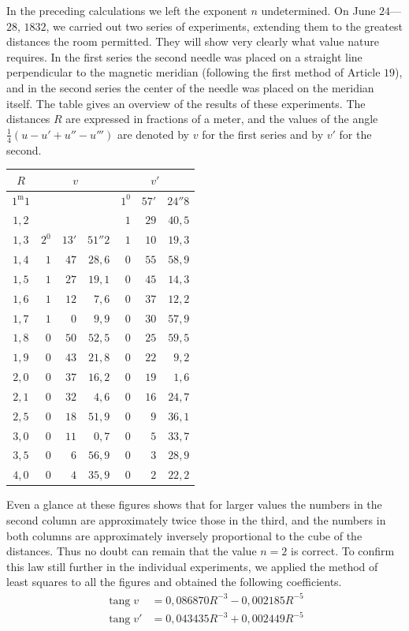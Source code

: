 In the preceding calculations we left the exponent $n$ undetermined. On June $24$—$28$, $1832$, we carried out two series of experiments, extending them to the greatest distances the room permitted. They will show very clearly what value nature requires. In the first series the second needle was placed on a straight line perpendicular to the magnetic meridian (following the first method of Article $19$), and in the second series the center of the needle was placed on the meridian itself. The table gives an overview of the results of these experiments. The distances $R$ are expressed in fractions of a meter, and the values of the angle $\frac14(u-u'+u''-u''')$ are denoted by $v$ for the first series and by $v'$ for the second.
\begin{center}
\begin{tabular}{c|rrr|rrr}
$R$&\multicolumn{3}{c|}{$v$}&\multicolumn{3}{c}{$v'$}\\\hline
$1^{\mathrm m}1$&&&&$1^0$&$57'$&$24''8$\\
$1{,}2$&&&&$1$&$29$&$40{,}5$\\
$1{,}3$&$2^0$&$13'$&$51''2$&$1$&$10$&$19{,}3$\\
$1{,}4$&$1$&$47$&$28{,}6$&$0$&$55$&$58{,}9$\\
$1{,}5$&$1$&$27$&$19{,}1$&$0$&$45$&$14{,}3$\\
$1{,}6$&$1$&$12$&$7{,}6$&$0$&$37$&$12{,}2$\\
$1{,}7$&$1$&$0$&$9{,}9$&$0$&$30$&$57{,}9$\\
$1{,}8$&$0$&$50$&$52{,}5$&$0$&$25$&$59{,}5$\\
$1{,}9$&$0$&$43$&$21{,}8$&$0$&$22$&$9{,}2$\\
$2{,}0$&$0$&$37$&$16{,}2$&$0$&$19$&$1{,}6$\\
$2{,}1$&$0$&$32$&$4{,}6$&$0$&$16$&$24{,}7$\\
$2{,}5$&$0$&$18$&$51{,}9$&$0$&$9$&$36{,}1$\\
$3{,}0$&$0$&$11$&$0{,}7$&$0$&$5$&$33{,}7$\\
$3{,}5$&$0$&$6$&$56{,}9$&$0$&$3$&$28{,}9$\\
$4{,}0$&$0$&$4$&$35{,}9$&$0$&$2$&$22{,}2$
\end{tabular}
\end{center}

Even a glance at these figures shows that for larger values the numbers in the second column are approximately twice those in the third, and the numbers in both columns are approximately inversely proportional to the cube of the distances. Thus no doubt can remain that the value $n=2$ is correct. To confirm this law still further in the individual experiments, we applied the method of least squares to all the figures and obtained the following coefficients.
\[
\begin{aligned}
\operatorname{tang}v&=0{,}086870R^{-3}-0{,}002185R^{-5}\\
\operatorname{tang}v'&=0{,}043435R^{-3}+0{,}002449R^{-5}
\end{aligned}
\]

